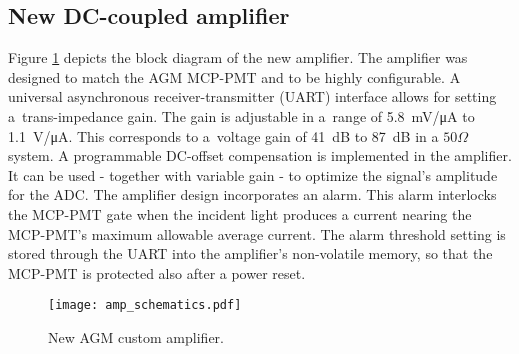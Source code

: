 \subsection{New DC-coupled amplifier}

Figure \ref{fig:amp_schematics} depicts the block diagram of the new amplifier.
%
The amplifier was designed to match the AGM MCP-PMT and to be  highly configurable.
%
A universal asynchronous receiver-transmitter (UART) interface allows for setting a~trans-impedance gain.
%
The gain is adjustable in a~range of \SI{5.8}{mV/\micro A} to \SI{1.1}{V/\micro A}.
%
This corresponds to a~voltage gain of \SI{41}{dB} to \SI{87}{dB} in a $50\Omega$ system.
%
A programmable DC-offset compensation is implemented in the amplifier.
%
It can be used - together with variable gain - to optimize the signal's amplitude for the ADC.
%
The amplifier design incorporates an alarm. This alarm interlocks the MCP-PMT gate when the incident light produces a current nearing the MCP-PMT's maximum allowable average current.
%
The alarm threshold setting is stored through the UART into the amplifier's non-volatile memory, so that 
the MCP-PMT is protected also after a power reset. %
%
%
\begin{figure}[!tbh]
    \centering
    \texttt{[image: amp\_schematics.pdf]}
    \caption{New AGM custom amplifier.}
    \label{fig:amp_schematics}
\end{figure}
%
